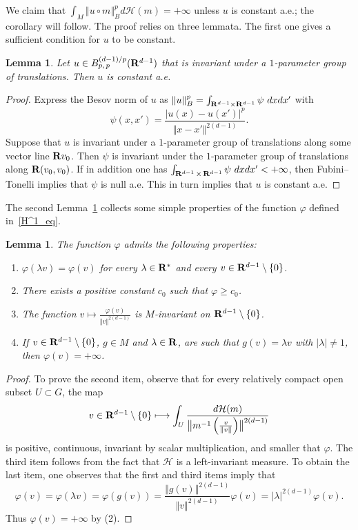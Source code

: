 \documentclass[11pt]{article}
\newtheorem{lemm}[theo]{Lemma}
\theoremstyle{definition}
\numberwithin{equation}{section}
\numberwithin{figure}{section}
\numberwithin{table}{section}
\begin{document}
We claim that $\int _M \Vert u \circ m \Vert _B ^p d\mathcal H (m) = +\infty$ unless $u$ is constant a.e.; the corollary will follow. The proof relies on three lemmata. The first one gives a sufficient condition for $u$ to be constant.

\begin{lemm}\label{H^1_lem0}
Let $u \in B_{p,\,p} ^{(d-1)/p} ({\bf R} ^{d-1})$ that is invariant under a $1$-parameter group of translations. Then $u$ is constant a.e.
\end{lemm}

\begin{proof}
Express the Besov norm of $u$ as $\Vert u \Vert _B ^p = \int _{{\bf R} ^{d-1} \times {\bf R} ^{d-1}} \psi~dxdx'$ with
\[
\psi (x,x') = \frac{\vert u(x) - u(x') \vert ^p}{\Vert x - x' \Vert ^{2(d-1)}}.
\]
Suppose that $u$ is invariant under a $1$-parameter group of translations along some vector line ${\bf R}v_0$. Then $\psi$ is invariant under the $1$-parameter group of translations along ${\bf R}(v_0, v_0)$. If in addition one has $\int _{{\bf R}^{d-1}\,\times\,{\bf R}^{d-1}} \psi~dxdx' < +\infty$, then Fubini--Tonelli implies that $\psi$ is null a.e. This in turn implies that $u$ is constant a.e.
\end{proof}

The second Lemma~\ref{H^1_lem1} collects some simple properties of the function $\varphi$ defined in~\eqref{H^1_eq}.

\begin{lemm}\label{H^1_lem1}
The function $\varphi$ admits the following properties:
\begin{enumerate}
\item $\varphi (\lambda v) = \varphi (v)$ for every $\lambda \in {\bf R}^*$ and every $v \in {\bf R} ^{d-1} \setminus \{0 \}$.
\item There exists a positive constant $c_0$ such that $\varphi \geqslant c_0$.
\item The function $v \mapsto \frac{\varphi (v)}{\Vert v \Vert ^{2(d-1)}}$ is $M$-invariant on ${\bf R} ^{d-1} \setminus \{0 \}$.
\item If $v \in {\bf R} ^{d-1} \setminus \{0 \}$, $g \in M$ and $\lambda \in {\bf R}$, are such that $g(v) = \lambda v$ with $\vert \lambda \vert \neq 1$, then $\varphi (v) = +\infty$.
\end{enumerate}
\end{lemm}

\begin{proof}
To prove the second item, observe that for every relatively compact open subset $U \subset G$, the map
\[
v \in {\bf R} ^{d-1} \setminus \{0 \} \longmapsto \int _U \frac{d \mathcal H (m)}{\bigl\Vert m^{-1} \left(\frac{v}{\Vert v \Vert}\right) \bigr\Vert ^{2(d-1)}}
\]
is positive, continuous, invariant by scalar multiplication, and smaller that $\varphi$. The third item follows from the fact that $\mathcal H$ is a left-invariant measure. To obtain the last item, one observes that the first and third items imply that
\[
\varphi (v) = \varphi (\lambda v) = \varphi (g(v)) = \frac{\Vert g(v) \Vert ^{2(d-1)}}{\Vert v \Vert ^{2(d-1)}} \varphi (v)
= \vert \lambda \vert ^{2(d-1)} \varphi (v).
\]
Thus $\varphi (v) = +\infty$ by (2).
\end{proof}
\end{document}
